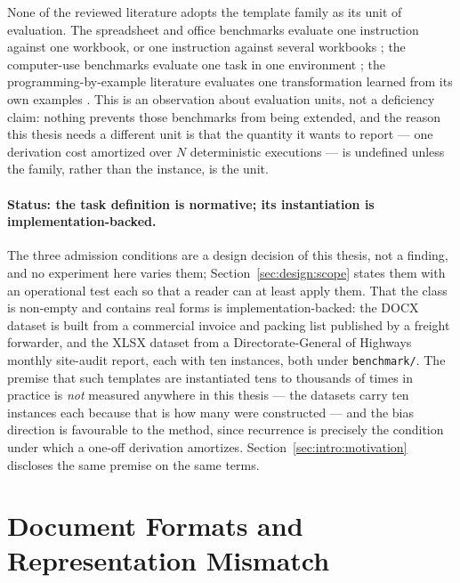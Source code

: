 None of the reviewed literature adopts the template family as its unit of evaluation. The
spreadsheet and office benchmarks evaluate one instruction against one workbook, or one
instruction against several workbooks
\cite{ma2024spreadsheetbench,lv2026mindthegap,li2023sheetcopilot}; the computer-use benchmarks
evaluate one task in one environment \cite{xie2024osworld,zhao2025worldgui}; the
programming-by-example literature evaluates one transformation learned from its own examples
\cite{gulwani2011flashfill,cambronero2023flashfillpp}. This is an observation about evaluation
units, not a deficiency claim: nothing prevents those benchmarks from being extended, and the
reason this thesis needs a different unit is that the quantity it wants to report --- one
derivation cost amortized over $N$ deterministic executions --- is undefined unless the family,
rather than the instance, is the unit.

\paragraph{Status: the task definition is normative; its instantiation is
implementation-backed.}
The three admission conditions are a design decision of this thesis, not a finding, and no
experiment here varies them; Section~\ref{sec:design:scope} states them with an operational
test each so that a reader can at least apply them. That the class is non-empty and contains
real forms is implementation-backed: the DOCX dataset is built from a commercial
invoice and packing list published by a freight forwarder, and the XLSX dataset from a
Directorate-General of Highways monthly site-audit report, each with ten instances, both under
\texttt{benchmark/}. The premise that such templates are instantiated tens to thousands of
times in practice is \emph{not} measured anywhere in this thesis --- the datasets carry ten
instances each because that is how many were constructed --- and the bias direction is
favourable to the method, since recurrence is precisely the condition under which a one-off
derivation amortizes. Section~\ref{sec:intro:motivation} discloses the same premise on the same
terms.

\section{Document Formats and Representation Mismatch}
\label{sec:rel:formats}

